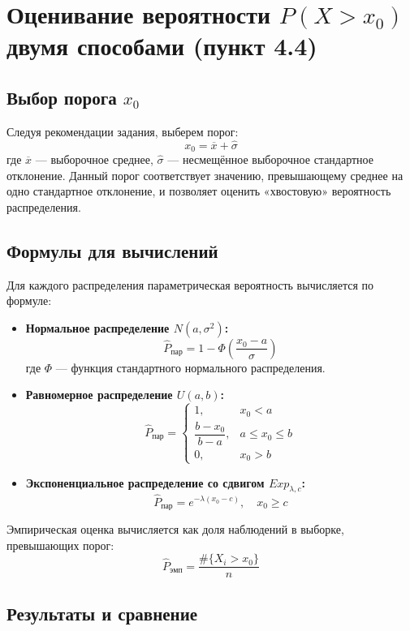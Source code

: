 \documentclass[a4paper,12pt]{article}
\begin{document}
\newpage

\section{Оценивание вероятности $P(X > x_0)$ двумя способами (пункт 4.4)}

\subsection{Выбор порога $x_0$}
Следуя рекомендации задания, выберем порог:
\[
x_0 = \overline{x} + \hat{\sigma}
\]
где $\overline{x}$ — выборочное среднее, $\hat{\sigma}$ — несмещённое выборочное стандартное отклонение. Данный порог соответствует значению, превышающему среднее на одно стандартное отклонение, и позволяет оценить «хвостовую» вероятность распределения.

\subsection{Формулы для вычислений}
Для каждого распределения параметрическая вероятность вычисляется по формуле:

\begin{itemize}
    \item \textbf{Нормальное распределение $N(a,\sigma^2)$:}
    \[
    \hat{P}_{\text{пар}} = 1 - \Phi\left(\frac{x_0 - a}{\sigma}\right)
    \]
    где $\Phi$ — функция стандартного нормального распределения.
    
    \item \textbf{Равномерное распределение $U(a,b)$:}
    \[
    \hat{P}_{\text{пар}} = 
    \begin{cases}
    1, & x_0 < a \\
    \dfrac{b - x_0}{b - a}, & a \le x_0 \le b \\
    0, & x_0 > b
    \end{cases}
    \]
    
    \item \textbf{Экспоненциальное распределение со сдвигом $Exp_{\lambda,c}$:}
    \[
    \hat{P}_{\text{пар}} = e^{-\lambda(x_0 - c)}, \quad x_0 \ge c
    \]
\end{itemize}

Эмпирическая оценка вычисляется как доля наблюдений в выборке, превышающих порог:
\[
\hat{P}_{\text{эмп}} = \frac{\#\{X_i > x_0\}}{n}
\]

\subsection{Результаты и сравнение}
\end{document}
